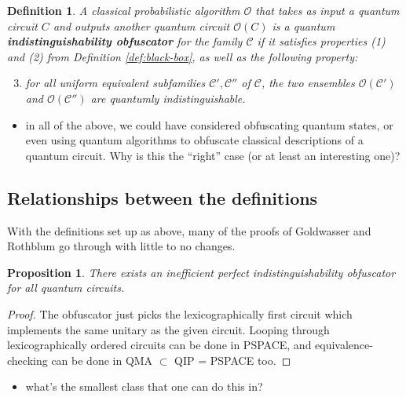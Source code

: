 \documentclass[11pt]{article}
\numberwithin{equation}{section}
\newtheorem{proposition}{Proposition}
\newtheorem{definition}{Definition}
\begin{document}
\begin{definition} A classical probabilistic algorithm $\mathcal O$ that takes as input a quantum circuit $C$ and outputs another quantum circuit $\mathcal O(C)$ is a quantum {\bf indistinguishability obfuscator} for the family $\mathcal C$ if it satisfies properties (1) and (2) from Definition \ref{def:black-box}, as well as the following property:
\begin{enumerate}
\setcounter{enumi}{2}
\item for all uniform equivalent subfamilies $\mathcal C', \mathcal C''$ of $\mathcal C$, the two ensembles $\mathcal O(\mathcal C')$ and $\mathcal O(\mathcal C'')$ are quantumly indistinguishable.
\end{enumerate}
\end{definition}

\begin{itemize}
\item in all of the above, we could have considered obfuscating quantum states, or even using quantum algorithms to obfuscate classical descriptions of a quantum circuit. Why is this the ``right'' case (or at least an interesting one)?
\end{itemize}

\subsection{Relationships between the definitions}

With the definitions set up as above, many of the proofs of Goldwasser and Rothblum go through with little to no changes.

\begin{proposition} There exists an inefficient perfect indistinguishability obfuscator for all quantum circuits.
\end{proposition}
\begin{proof}
The obfuscator just picks the lexicographically first circuit which implements the same unitary as the given circuit. Looping through lexicographically ordered circuits can be done in PSPACE, and equivalence-checking can be done in QMA $\subset$ QIP = PSPACE too.
\end{proof}

\begin{itemize}
\item what's the smallest class that one can do this in?
\end{itemize}
\end{document}
